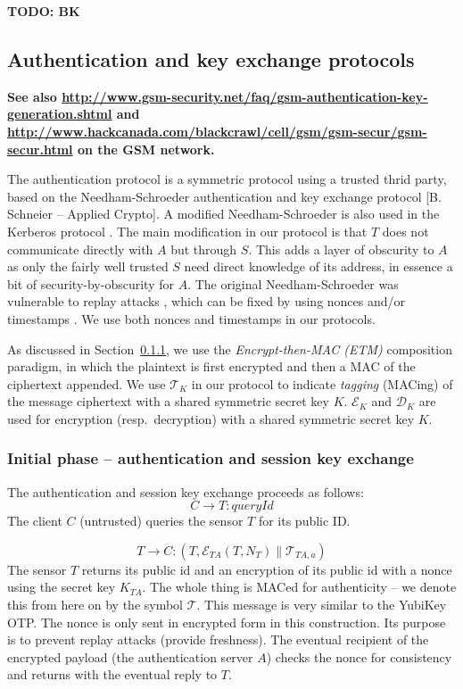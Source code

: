 \textbf{TODO: BK}

\subsection{Authentication and key exchange protocols}

\textbf{See also \url{http://www.gsm-security.net/faq/gsm-authentication-key-generation.shtml} and \url{http://www.hackcanada.com/blackcrawl/cell/gsm/gsm-secur/gsm-secur.html} on the GSM network.}

The authentication protocol is a symmetric protocol using a trusted thrid party, based on the Needham-Schroeder authentication and key exchange protocol  [B. Schneier -- Applied Crypto]. A modified Needham-Schroeder is also used in the Kerberos protocol . The main modification in our protocol is that $T$ does not communicate directly with $A$ but through $S$. This adds a layer of obscurity to $A$ as only the fairly well trusted $S$ need direct knowledge of its address, in essence a bit of security-by-obscurity for $A$.
%
The original Needham-Schroeder was vulnerable to replay attacks , which can be fixed by using nonces and/or timestamps \cite{needham1987}. We use both nonces and timestamps in our protocols.

As discussed in Section~\ref{}, we use the \textit{Encrypt-then-MAC (ETM)}  composition paradigm, in which the plaintext is first encrypted and then a MAC of the ciphertext appended. We use $\mathcal{T}_K$ in our protocol to indicate \textit{tagging} (MACing) of the message ciphertext with a shared symmetric secret key $K$. $\mathcal{E}_K$ and $\mathcal{D}_K$ are used for encryption (resp.\ decryption) with a shared symmetric secret key $K$.

\subsubsection{Initial phase -- authentication and session key exchange}

The authentication and session key exchange proceeds as follows:
\[
C \rightarrow T: \textit{queryId}
\]
The client $C$ (untrusted) queries the sensor $T$ for its public ID.

\[
T \rightarrow C: (T,\mathcal{E}_{TA}(T,N_T) \parallel \mathcal{T}_{TA,a})
\]
The sensor $T$ returns its public id and an encryption of its public id with a nonce using the secret key $K_{TA}$. The whole thing is MACed for authenticity -- we denote this from here on by the symbol $\mathcal{T}$. This message is very similar to the YubiKey OTP. The nonce is only sent in encrypted form in this construction. Its purpose is to prevent replay attacks (provide freshness). The eventual recipient of the encrypted payload (the authentication server $A$) checks the nonce for consistency and returns with the eventual reply to $T$.

